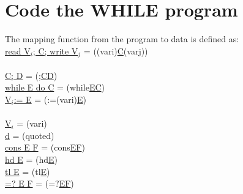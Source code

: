 \section{Code the WHILE program}\label{appendix:code while}
The mapping function from the \WHILE program to \WHILE data is defined as:\\
\indent\hspace{3cm}\underline{read V$_i$; C; write V$_j$}\hspace{0.5cm} = \hspace{0.5cm} ((vari)\underline{C}(varj))\\\\
\indent\hspace{3cm}\underline{C; D}\hspace{3.3cm} = \hspace{0.5cm} (;\underline{CD})\\
\indent\hspace{3cm}\underline{while E do C}\hspace{1.8cm} = \hspace{0.5cm} (while\underline{EC})\\
\indent\hspace{3cm}\underline{V$_i$:= E}\hspace{2.9cm} = \hspace{0.5cm} (:=(vari)\underline{E})\\\\
\indent\hspace{3cm}\underline{V$_i$}\hspace{3.75cm} = \hspace{0.5cm} (vari)\\
\indent\hspace{3cm}\underline{d}\hspace{3.95cm} = \hspace{0.5cm} (quoted)\\
\indent\hspace{3cm}\underline{cons E F}\hspace{2.6cm} = \hspace{0.5cm} (cons\underline{EF})\\
\indent\hspace{3cm}\underline{hd E}\hspace{3.33cm} = \hspace{0.5cm} (hd\underline{E})\\
\indent\hspace{3cm}\underline{tl E}\hspace{3.5cm} = \hspace{0.5cm} (tl\underline{E})\\
\indent\hspace{3cm}\underline{=? E F}\hspace{2.8cm} = \hspace{0.5cm} (=?\underline{EF})\\
